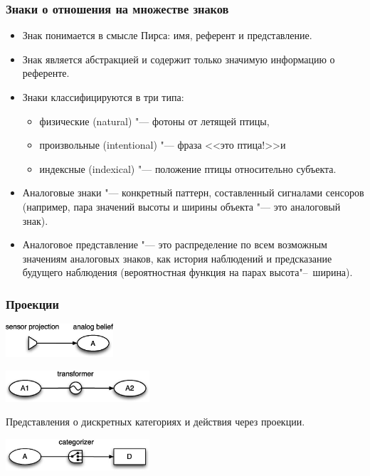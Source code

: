 \documentclass[default]{beamer}
\begin{document}
	\begin{frame}
		\frametitle{Знаки о отношения на множестве знаков}
		
		\begin{itemize}
			\item Знак понимается в смысле Пирса: имя, референт и представление.
			\item Знак является абстракцией и содержит только значимую информацию о референте.
			\item Знаки классифицируются в три типа: 
			\begin{itemize}
				\item физические (natural) "--- фотоны от летящей птицы,
				\item произвольные (intentional) "--- фраза <<это птица!>>и
				\item индексные (indexical) "--- положение птицы относительно субъекта.
			\end{itemize}
			\item Аналоговые знаки "--- конкретный паттерн, составленный сигналами сенсоров (например, пара значений высоты и ширины объекта "--- это аналоговый знак).		
			\item Аналоговое представление "--- это распределение по всем возможным значениям аналоговых знаков, как история наблюдений и предсказание будущего наблюдения (вероятностная функция на парах высота"--~ширина).
		\end{itemize}
	\end{frame}

	\begin{frame}
		\frametitle{Проекции}
		
		\begin{center}
			\includegraphics[width=0.3\textwidth]{roy_sens_proj}
			\par\bigskip
			\includegraphics[width=0.4\textwidth]{roy_transf_proj}
		\end{center}
		Представления о дискретных категориях и действия через проекции.
		\begin{center}
			\includegraphics[width=0.4\textwidth]{roy_cat_proj}
		\end{center}
	\end{frame}
	
\end{document}
